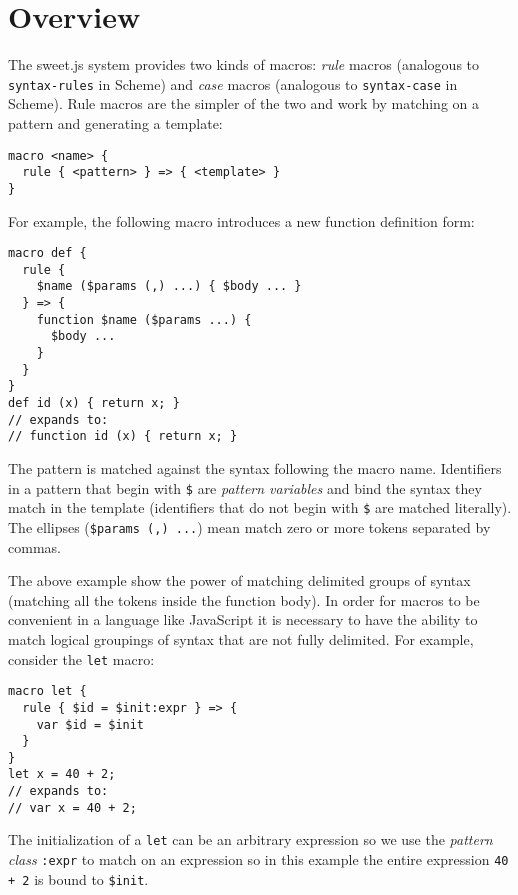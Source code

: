 \documentclass[preprint,10pt]{sigplanconf}
\begin{document}
\section{Overview}

The sweet.js system provides two kinds of macros: \emph{rule} macros
(analogous to \lstinline!syntax-rules! in Scheme) and \emph{case}
macros (analogous to \lstinline!syntax-case! in Scheme). Rule macros
are the simpler of the two and work by matching on a pattern and
generating a template:

\begin{lstlisting}
macro <name> {
  rule { <pattern> } => { <template> }
}
\end{lstlisting}

For example, the following macro introduces a new function definition
form:

\begin{lstlisting}
macro def {
  rule { 
    $name ($params (,) ...) { $body ... } 
  } => {
    function $name ($params ...) {
      $body ...
    }
  }
}
def id (x) { return x; }
// expands to:
// function id (x) { return x; }
\end{lstlisting}

The pattern is matched against the syntax following the macro name.
Identifiers in a pattern that begin with \lstinline!$! are
\emph{pattern variables} and bind the syntax they match in the
template (identifiers that do not begin with \lstinline!$! are matched
literally). The ellipses (\lstinline!$params (,) ...!) mean match zero or more
tokens separated by commas.

The above example show the power of matching delimited groups of
syntax (\ie matching all the tokens inside the function body). In
order for macros to be convenient in a language like JavaScript it is
necessary to have the ability to match logical groupings of syntax
that are not fully delimited. For example, consider the
\lstinline!let! macro:

\begin{lstlisting}
macro let {
  rule { $id = $init:expr } => {
    var $id = $init
  }
}
let x = 40 + 2;
// expands to:
// var x = 40 + 2;
\end{lstlisting}

The initialization of a \lstinline!let! can be an arbitrary expression
so we use the \emph{pattern class} \lstinline!:expr! to match on an
expression so in this example the entire expression \lstinline!40 + 2!
is bound to \lstinline!$init!.
\end{document}
